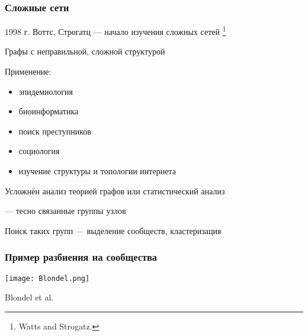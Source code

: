 \begin{frame}
	\frametitle{Сложные сети}

	1998 г. Воттс, Строгатц --- начало изучения сложных сетей%
	\footnote{Watts and Strogatz. } \vspace{.5em}

	Графы с неправильной, сложной структурой \vspace{.5em}

	Применение:
	\begin{itemize}
		\item эпидемиология
		\item биоинформатика
		\item поиск преступников
		\item социология
		\item изучение структуры и топологии интернета
	\end{itemize} \vspace{.5em}

	Усложнён анализ теорией графов или статистический анализ \vspace{.5em}

	 --- тесно связанные группы узлов \vspace{.5em}

	Поиск таких групп --- выделение сообществ, кластеризация
\end{frame}

\begin{frame}
	\frametitle{Пример разбиения на сообщества}
	\begin{center}
		\texttt{[image: Blondel.png]}
	\end{center}
	\scriptsize Blondel et al. 
\end{frame}

